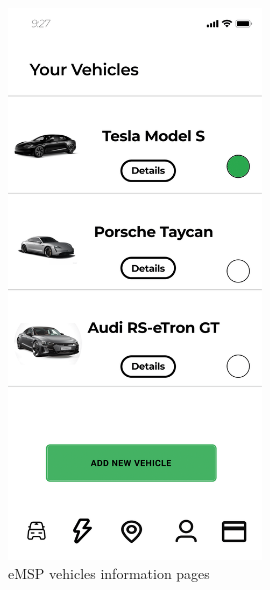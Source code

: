 \documentclass{Configuration_Files/PoliMi3i_thesis}
\begin{document}
\begin{figure}[H]
    \centering
    \includegraphics[width=0.6\textwidth]{Images/user-interface/emsp/eMSP (1)-05.png}
    \caption{eMSP vehicles information pages}
\end{figure}
\end{document}
